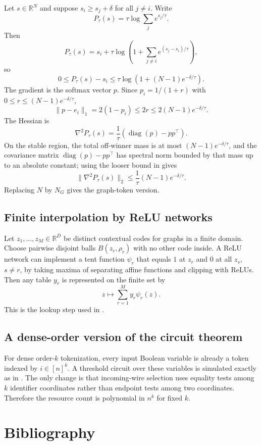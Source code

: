 \documentclass[11pt]{article}
\DeclareMathOperator{\diag}{diag}
\newcommand{\R}{\mathbb{R}}
\begin{document}
Let $s\in\R^N$ and suppose $s_i\ge s_j+\delta$ for all $j\ne i$.  Write
\[
  P_\tau(s)=\tau\log\sum_j e^{s_j/\tau}.
\]
Then
\[
  P_\tau(s)
  =
  s_i+\tau\log\left(1+\sum_{j\ne i} e^{(s_j-s_i)/\tau}\right),
\]
so
\[
  0\le P_\tau(s)-s_i
  \le
  \tau\log(1+(N-1)e^{-\delta/\tau}).
\]
The gradient is the softmax vector $p$.  Since $p_i=1/(1+r)$ with $0\le r\le (N-1)e^{-\delta/\tau}$,
\[
  \|p-e_i\|_1=2(1-p_i)\le 2r\le 2(N-1)e^{-\delta/\tau}.
\]
The Hessian is
\[
  \nabla^2P_\tau(s)=\frac1\tau(\diag(p)-pp^\top).
\]
On the stable region, the total off-winner mass is at most $(N-1)e^{-\delta/\tau}$, and the covariance matrix $\diag(p)-pp^\top$ has spectral norm bounded by that mass up to an absolute constant; using the looser bound in \cite{su2026tropicalexpressivity} gives
\[
  \|\nabla^2P_\tau(s)\|_2\le \frac1\tau(N-1)e^{-\delta/\tau}.
\]
Replacing $N$ by $N_G$ gives the graph-token version.

\subsection{Finite interpolation by ReLU networks}

Let $z_1,\dots,z_M\in\R^D$ be distinct contextual codes for graphs in a finite domain.  Choose pairwise disjoint balls $B(z_r,\rho_r)$ with no other code inside.  A ReLU network can implement a tent function $\psi_r$ that equals $1$ at $z_r$ and $0$ at all $z_s$, $s\ne r$, by taking maxima of separating affine functions and clipping with ReLUs.  Then any table $y_r$ is represented on the finite set by
\[
  z\mapsto \sum_{r=1}^M y_r\psi_r(z).
\]
This is the lookup step used in .

\subsection{A dense-order version of the circuit theorem}

For dense order-$k$ tokenization, every input Boolean variable is already a token indexed by $i\in[n]^k$.  A threshold circuit over these variables is simulated exactly as in .  The only change is that incoming-wire selection uses equality tests among $k$ identifier coordinates rather than endpoint tests among two coordinates.  Therefore the resource count is polynomial in $n^k$ for fixed $k$.

\section{Bibliography}
\end{document}
